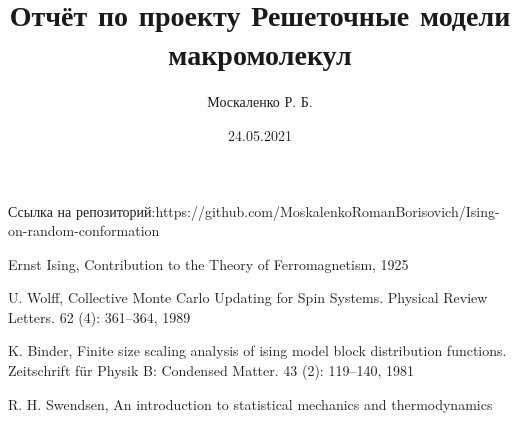 \documentclass[a4paper,14pt]{extarticle}
\title{Отчёт по проекту Решеточные модели макромолекул}
\author{Москаленко Р. Б.}
\date{24.05.2021}
\begin{document}
\maketitle

%





%







\begin{thebibliography}{9}
 Ссылка на репозиторий:https://github.com/MoskalenkoRomanBorisovich/Ising-on-random-conformation 
 
Ernst Ising, Contribution to the Theory of Ferromagnetism, 1925


 U. Wolff, Collective Monte Carlo Updating for Spin Systems. Physical Review Letters. 62 (4): 361–364, 1989
 
 K. Binder, Finite size scaling analysis of ising model block distribution functions. Zeitschrift für Physik B: Condensed Matter. 43 (2): 119–140, 1981

 R. H. Swendsen, An introduction to statistical mechanics and thermodynamics
\end{thebibliography}
\end{document}
